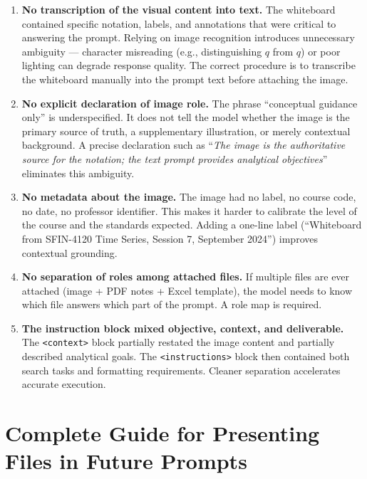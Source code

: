 \documentclass[12pt,a4paper]{article}
\begin{document}
\begin{enumerate}
  \item \textbf{No transcription of the visual content into text.}
  The whiteboard contained specific notation, labels, and annotations that were
  critical to answering the prompt. Relying on image recognition introduces
  unnecessary ambiguity — character misreading (e.g., distinguishing $q$ from
  $q\!$) or poor lighting can degrade response quality. The correct procedure is
  to transcribe the whiteboard manually into the prompt text before attaching the
  image.

  \item \textbf{No explicit declaration of image role.}
  The phrase ``conceptual guidance only'' is underspecified. It does not tell the
  model whether the image is the primary source of truth, a supplementary
  illustration, or merely contextual background. A precise declaration such as
  ``\textit{The image is the authoritative source for the notation; the text prompt
  provides analytical objectives}'' eliminates this ambiguity.

  \item \textbf{No metadata about the image.}
  The image had no label, no course code, no date, no professor identifier. This
  makes it harder to calibrate the level of the course and the standards expected.
  Adding a one-line label (``Whiteboard from SFIN-4120 Time Series, Session 7,
  September 2024'') improves contextual grounding.

  \item \textbf{No separation of roles among attached files.}
  If multiple files are ever attached (image + PDF notes + Excel template), the
  model needs to know which file answers which part of the prompt. A role map
  is required.

  \item \textbf{The instruction block mixed objective, context, and deliverable.}
  The \texttt{<context>} block partially restated the image content and partially
  described analytical goals. The \texttt{<instructions>} block then contained
  both search tasks and formatting requirements. Cleaner separation accelerates
  accurate execution.
\end{enumerate}

\section{Complete Guide for Presenting Files in Future Prompts}
\end{document}
